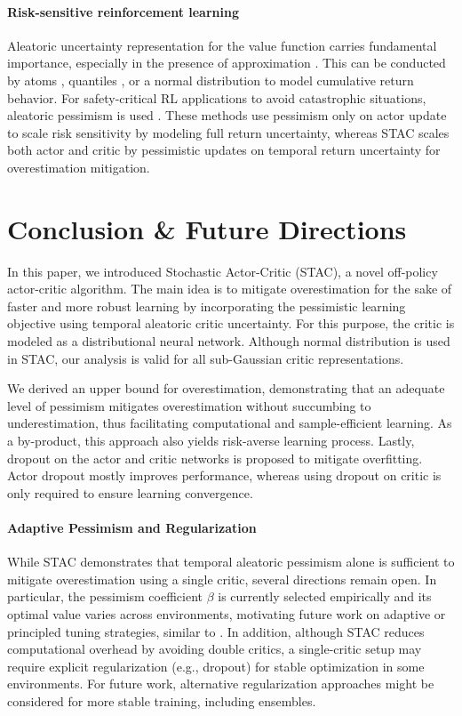\documentclass[10pt]{article} %
\begin{document}
\paragraph{Risk-sensitive reinforcement learning}  
Aleatoric uncertainty representation for the value function carries fundamental importance, especially in the presence of approximation \citep{bellemare2017distributional}. This can be conducted by atoms \citep{bellemare2017distributional}, quantiles \citep{dabney2018distributional, ma2025dsac}, or a normal distribution \citep{tang2019worst, yang2021wcsac} to model cumulative return behavior. For safety-critical RL applications to avoid catastrophic situations, aleatoric pessimism is used \citep{tang2019worst,yang2021wcsac,lim2022distributional,greenberg2022efficient,ma2025dsac}. These methods use pessimism only on actor update to scale risk sensitivity by modeling full return uncertainty, whereas STAC scales both actor and critic by pessimistic updates on temporal return uncertainty for overestimation mitigation. 

\section{Conclusion \& Future Directions}

In this paper, we introduced Stochastic Actor-Critic (STAC), a novel off-policy actor-critic algorithm. The main idea is to mitigate overestimation for the sake of faster and more robust learning by incorporating the pessimistic learning objective using temporal aleatoric critic uncertainty. For this purpose, the critic is modeled as a distributional neural network. Although normal distribution is used in STAC, our analysis is valid for all sub-Gaussian critic representations. 

We derived an upper bound for overestimation, demonstrating that an adequate level of pessimism mitigates overestimation without succumbing to underestimation, thus facilitating computational and sample-efficient learning. As a by-product, this approach also yields risk-averse learning process. Lastly, dropout on the actor and critic networks is proposed to mitigate overfitting. Actor dropout mostly improves performance, whereas using dropout on critic is only required to ensure learning convergence. 

\paragraph{Adaptive Pessimism and Regularization} While STAC demonstrates that temporal aleatoric pessimism alone is sufficient to mitigate overestimation using a single critic, several directions remain open. In particular, the pessimism coefficient $\beta$ is currently selected empirically and its optimal value varies across environments, motivating future work on adaptive or principled tuning strategies, similar to \citet{moskovitz2021tactical, cetin2023learning}. In addition, although STAC reduces computational overhead by avoiding double critics, a single-critic setup may require explicit regularization (e.g., dropout) for stable optimization in some environments. For future work, alternative regularization approaches might be considered for more stable training, including ensembles. 
\end{document}
